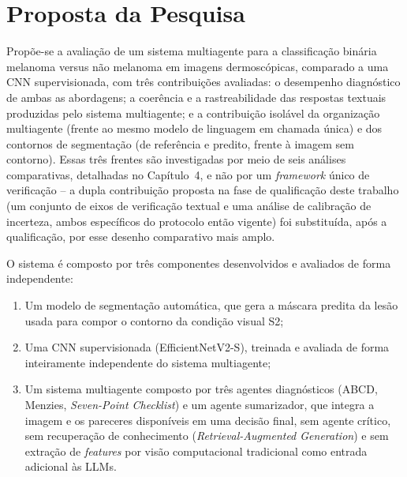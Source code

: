 \section{Proposta da Pesquisa}

Propõe-se a avaliação de um sistema multiagente para a classificação binária melanoma versus não melanoma em imagens dermoscópicas, comparado a uma CNN supervisionada, com três contribuições avaliadas: o desempenho diagnóstico de ambas as abordagens; a coerência e a rastreabilidade das respostas textuais produzidas pelo sistema multiagente; e a contribuição isolável da organização multiagente (frente ao mesmo modelo de linguagem em chamada única) e dos contornos de segmentação (de referência e predito, frente à imagem sem contorno). Essas três frentes são investigadas por meio de seis análises comparativas, detalhadas no Capítulo~4, e não por um \textit{framework} único de verificação -- a dupla contribuição proposta na fase de qualificação deste trabalho (um conjunto de eixos de verificação textual e uma análise de calibração de incerteza, ambos específicos do protocolo então vigente) foi substituída, após a qualificação, por esse desenho comparativo mais amplo.

O sistema é composto por três componentes desenvolvidos e avaliados de forma independente:
\begin{enumerate}
    \item Um modelo de segmentação automática, que gera a máscara predita da lesão usada para compor o contorno da condição visual S2;
    \item Uma CNN supervisionada (EfficientNetV2-S), treinada e avaliada de forma inteiramente independente do sistema multiagente;
    \item Um sistema multiagente composto por três agentes diagnósticos (ABCD, Menzies, \textit{Seven-Point Checklist}) e um agente sumarizador, que integra a imagem e os pareceres disponíveis em uma decisão final, sem agente crítico, sem recuperação de conhecimento (\textit{Retrieval-Augmented Generation}) e sem extração de \textit{features} por visão computacional tradicional como entrada adicional às LLMs.
\end{enumerate}

